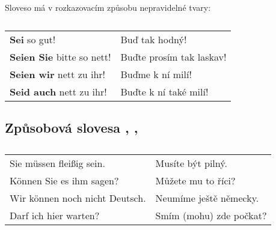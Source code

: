       Sloveso \textbf{} má v rozkazovacím způsobu nepravidelné tvary:
      \begin{table}[ht!]
        \hspace*{1em}
        \begin{tabular}{ll}  %
          \hline
          \textbf{Sei} so gut!              &  Buď tak hodný!           \\
          \textbf{Seien Sie} bitte so nett! &  Buďte prosím tak laskav! \\
          \textbf{Seien wir} nett zu ihr!   &  Buďme k ní milí!         \\
          \textbf{Seid auch} nett zu ihr!   &  Buďte k ní také milí!    \\
          \hline
        \end{tabular}
        \caption*{}
      \end{table}

    \subsection*{Způsobová slovesa , , }
      \begin{table}[ht!]   %
        \hspace*{1em}
        \begin{tabular}{ll}
          \hline
             Sie müssen fleißig sein.         & Musíte být pilný.             \\
             Können Sie es ihm sagen?         & Můžete mu to říci?            \\
             Wir können noch nicht Deutsch.   & Neumíme ještě německy.        \\
             Darf ich hier warten?            & Smím (mohu) zde počkat?       \\
          \hline
        \end{tabular}
        \caption*{ }
      \end{table}
      
